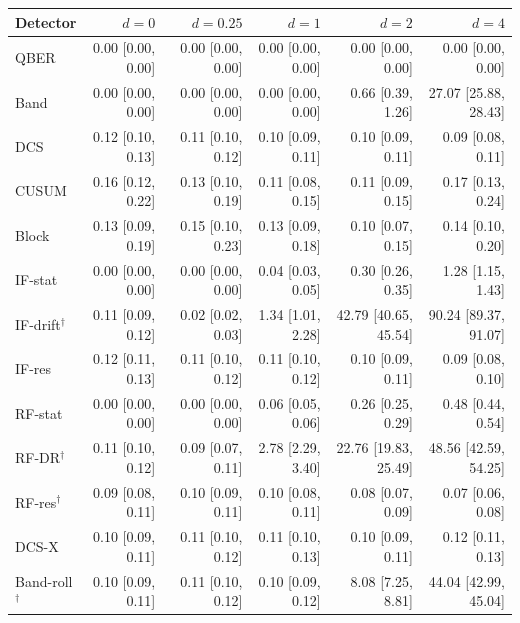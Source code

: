\begin{tabular}{lrrrrr}
\hline
Detector & $d=0$ & $d=0.25$ & $d=1$ & $d=2$ & $d=4$\\
\hline
QBER & 0.00 [0.00, 0.00] & 0.00 [0.00, 0.00] & 0.00 [0.00, 0.00] & 0.00 [0.00, 0.00] & 0.00 [0.00, 0.00]\\
Band & 0.00 [0.00, 0.00] & 0.00 [0.00, 0.00] & 0.00 [0.00, 0.00] & 0.66 [0.39, 1.26] & 27.07 [25.88, 28.43]\\
DCS & 0.12 [0.10, 0.13] & 0.11 [0.10, 0.12] & 0.10 [0.09, 0.11] & 0.10 [0.09, 0.11] & 0.09 [0.08, 0.11]\\
CUSUM & 0.16 [0.12, 0.22] & 0.13 [0.10, 0.19] & 0.11 [0.08, 0.15] & 0.11 [0.09, 0.15] & 0.17 [0.13, 0.24]\\
Block & 0.13 [0.09, 0.19] & 0.15 [0.10, 0.23] & 0.13 [0.09, 0.18] & 0.10 [0.07, 0.15] & 0.14 [0.10, 0.20]\\
IF-stat & 0.00 [0.00, 0.00] & 0.00 [0.00, 0.00] & 0.04 [0.03, 0.05] & 0.30 [0.26, 0.35] & 1.28 [1.15, 1.43]\\
IF-drift$^\dagger$ & 0.11 [0.09, 0.12] & 0.02 [0.02, 0.03] & 1.34 [1.01, 2.28] & 42.79 [40.65, 45.54] & 90.24 [89.37, 91.07]\\
IF-res & 0.12 [0.11, 0.13] & 0.11 [0.10, 0.12] & 0.11 [0.10, 0.12] & 0.10 [0.09, 0.11] & 0.09 [0.08, 0.10]\\
RF-stat & 0.00 [0.00, 0.00] & 0.00 [0.00, 0.00] & 0.06 [0.05, 0.06] & 0.26 [0.25, 0.29] & 0.48 [0.44, 0.54]\\
RF-DR$^\dagger$ & 0.11 [0.10, 0.12] & 0.09 [0.07, 0.11] & 2.78 [2.29, 3.40] & 22.76 [19.83, 25.49] & 48.56 [42.59, 54.25]\\
RF-res$^\dagger$ & 0.09 [0.08, 0.11] & 0.10 [0.09, 0.11] & 0.10 [0.08, 0.11] & 0.08 [0.07, 0.09] & 0.07 [0.06, 0.08]\\
DCS-X & 0.10 [0.09, 0.11] & 0.11 [0.10, 0.12] & 0.11 [0.10, 0.13] & 0.10 [0.09, 0.11] & 0.12 [0.11, 0.13]\\
Band-roll$^\dagger$ & 0.10 [0.09, 0.11] & 0.11 [0.10, 0.12] & 0.10 [0.09, 0.12] & 8.08 [7.25, 8.81] & 44.04 [42.99, 45.04]\\
\hline
\end{tabular}